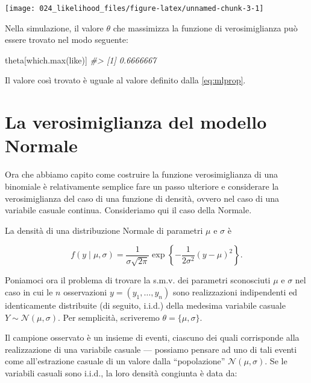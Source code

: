 \documentclass[
]{memoir}
\newenvironment{Shaded}{\begin{snugshade}}{\end{snugshade}}
\newcommand{\CommentTok}[1]{\textcolor[rgb]{0.56,0.35,0.01}{\textit{#1}}}
\newcommand{\FunctionTok}[1]{\textcolor[rgb]{0.00,0.00,0.00}{#1}}
\newcommand{\NormalTok}[1]{#1}
\theoremstyle{definition}
\theoremstyle{definition}
\theoremstyle{definition}
\theoremstyle{definition}
\theoremstyle{remark}
\begin{document}
\begin{center}\texttt{[image: 024\_likelihood\_files/figure-latex/unnamed-chunk-3-1]} \end{center}

Nella simulazione, il valore \(\theta\) che massimizza la funzione di verosimiglianza può essere trovato nel modo seguente:

\begin{Shaded}
\begin{Highlighting}[]
\NormalTok{theta[}\FunctionTok{which.max}\NormalTok{(like)]}
\CommentTok{\#\textgreater{} [1] 0.6666667}
\end{Highlighting}
\end{Shaded}

\noindent
Il valore così trovato è uguale al valore definito dalla \eqref{eq:mlprop}.

\hypertarget{la-verosimiglianza-del-modello-normale}{%
\section{La verosimiglianza del modello Normale}\label{la-verosimiglianza-del-modello-normale}}

Ora che abbiamo capito come costruire la funzione verosimiglianza di
una binomiale è relativamente semplice fare un passo ulteriore e
considerare la verosimiglianza del caso di una funzione di densità,
ovvero nel caso di una variabile casuale continua. Consideriamo qui il
caso della Normale.

La densità di una distribuzione Normale di parametri \(\mu\) e \(\sigma\) è

\[
f(y \mid \mu, \sigma) = \frac{1}{\sigma \sqrt{2\pi}} \exp\left\{-\frac{1}{2\sigma^2}(y-\mu)^2\right\}.
\label{eq:gausslike}
\]

Poniamoci ora il problema di trovare la s.m.v. dei parametri sconosciuti \(\mu\) e \(\sigma\) nel caso in cui le \(n\) osservazioni \(y = (y_1, \dots, y_n)\) sono realizzazioni indipendenti ed identicamente distribuite (di seguito, i.i.d.) della medesima variabile casuale \(Y \sim \mathcal{N}(\mu, \sigma)\). Per semplicità, scriveremo \(\theta = \{\mu, \sigma\}.\)

Il campione osservato è un insieme di eventi, ciascuno dei quali corrisponde alla realizzazione di una variabile casuale --- possiamo pensare ad uno di tali eventi come all'estrazione casuale di un valore dalla ``popolazione'' \(\mathcal{N}(\mu, \sigma)\). Se le variabili casuali sono i.i.d., la loro densità congiunta è data da:
\end{document}
